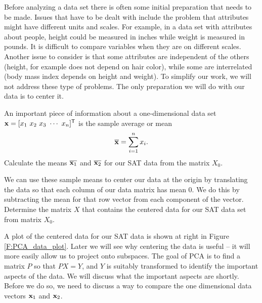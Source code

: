 \begin{pactivity} \label{act:PCA_centering} Before analyzing a data set there is often some initial preparation that needs to be made. Issues that have to be dealt with include the problem that attributes might have different units and scales. For example, in a data set with attributes about people, height could be measured in inches while weight is measured in pounds. It is difficult to compare variables when they are on different scales. Another issue to consider is that some attributes are independent of the others (height, for example does not depend on hair color), while some are interrelated (body mass index depends on height and weight). To simplify our work, we will not address these type of problems. The only preparation we will do with our data is to center it. 
\ba
\item An important piece of information about a one-dimensional data set $\vx = [x_1 \ x_2 \ x_3 \ \cdots \ x_n]^{\tr}$  is the sample average or mean
\[\overline{\mathbf{x}} = \sum_{i=1}^n x_i.\]
Calculate the means $\overline{\mathbf{x}_1}$ and $\overline{\mathbf{x}_2}$ for our SAT data from the matrix $X_0$. 

\item We can use these sample means to center our data at the origin by translating the data so that each column of our data matrix has mean $0$. We do this by subtracting the mean for that row vector from each component of the vector. Determine the matrix $X$ that contains the centered data for our SAT data set from matrix $X_0$.


\ea

\end{pactivity}


A plot of the centered data for our SAT data is shown at right in Figure \ref{F:PCA_data_plot}. Later we will see why centering the data is useful -- it will more easily allow us to project onto subspaces.  The goal of PCA is to find a matrix $P$ so that $PX = Y$, and $Y$ is suitably transformed to identify the important aspects of the data. We will discuss what the important aspects are shortly. Before we do so, we need to discuss a way to compare the one dimensional data vectors $\mathbf{x}_1$ and $\mathbf{x}_2$. 

